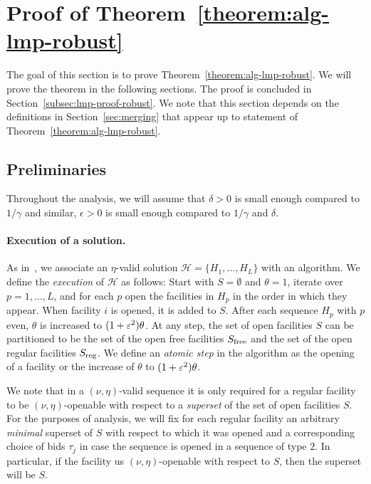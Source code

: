 \section{Proof of Theorem~\ref{theorem:alg-lmp-robust}}
\label{sec:logad-robust}

The goal of this section is to prove Theorem~\ref{theorem:alg-lmp-robust}.
We will prove the theorem in the following sections.
The proof is concluded in Section~\ref{subsec:lmp-proof-robust}.
We note that this section depends on the definitions in Section~\ref{sec:merging} that appear up to statement of Theorem~\ref{theorem:alg-lmp-robust}.

\subsection{Preliminaries}
Throughout the analysis, we will assume that $\delta > 0$ is small enough compared to $1/\gamma$ and similar, $\epsilon > 0$ is small enough compared to $1/\gamma$ and $\delta$.

\paragraph{Execution of a solution.}
As in~\cite{MR4928455-Cohen25}, we associate an $\eta$-valid solution $\mathcal{H} = \{ H_1, \dots, H_L \}$ with an algorithm.
We define the {\em execution} of $\mathcal{H}$ as follows: Start with $S = \emptyset$ and $\theta = 1$, iterate over $p = 1, \dots, L$, and for each $p$ open the facilities in $H_p$ in the order in which they appear.
When facility $i$ is opened, it is added to $S$.
After each sequence $H_p$ with $p$ even, $\theta$ is increased to $(1+\varepsilon^2) \theta$.
At any step, the set of open facilities $S$ can be partitioned to be the set of the open free facilities $S_{\mathrm{free}}$ and the set of the open regular facilities $S_{\mathrm{reg}}$. 
We define an \emph{atomic step} in the algorithm as the opening of a facility or the increase of $\theta$ to $(1+\varepsilon^2)\theta$.

We note that in a $(\nu,\eta)$-valid sequence it is only required for a regular facility to be $(\nu,\eta)$-openable with respect to a \emph{superset} of the set of open facilities $S$.
For the purposes of analysis, we will fix for each regular facility an arbitrary \emph{minimal} superset of $S$ with respect to which it was opened and a corresponding choice of bids $\tau_j$ in case the sequence is opened in a sequence of type $2$.
In particular, if the facility us $(\nu,\eta)$-openable with respect to $S$, then the superset will be $S$.

